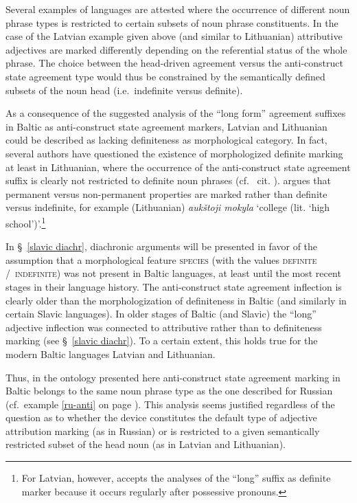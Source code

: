 Several examples of languages are attested where the occurrence of different noun phrase types is restricted to certain subsets of noun phrase constituents. In the case of the Latvian example given above (and similar to Lithuanian) attributive adjectives are marked differently depending on the referential status of the whole phrase. The choice between the head\hyp{}driven agreement versus the anti\hyp{}construct state agreement type would thus be constrained by the semantically defined subsets of the noun head (i.e.~indefinite versus definite). 

As a consequence of the suggested analysis of the “long form” agreement suffixes in Baltic as anti\hyp{}construct state agreement markers, Latvian and Lithuanian could be described as lacking definiteness as morphological category. In fact, several authors have questioned the existence of morphologized definite marking at least in Lithuanian, where the occurrence of the anti\hyp{}construct state agreement suffix is clearly not restricted to definite noun phrases (cf.~\citealt{wissemann1958} cit. \citealt[181–182]{kramsky1972}). \citet[37]{trost1966} argues that permanent versus non-permanent properties are marked rather than definite versus indefinite, for example (Lithuanian) \textit{aukštoji mokyla} ‘college (lit. ‘high school’)’.\footnote{For Latvian, however, \citet[38]{trost1966} accepts the analyses of the “long” suffix as definite marker because it occurs regularly after possessive pronouns.}

In \S~\ref{slavic diachr}, diachronic arguments will be presented in favor of the assumption that a morphological feature \textsc{species} (with the values \textsc{definite} /~\textsc{indefinite}) was not present in Baltic languages, at least until the most recent stages in their language history. The anti\hyp{}construct state agreement inflection is clearly older than the morphologization of definiteness in Baltic (and similarly in certain Slavic languages). In older stages of Baltic (and Slavic) the “long” adjective inflection was connected to attributive rather than to definiteness marking (see \S~\ref{slavic diachr}). To a certain extent, this holds true for the modern Baltic languages Latvian and Lithuanian.

Thus, in the ontology presented here anti\hyp{}construct state agreement marking in Baltic belongs to the same noun phrase type as the one described for Russian (cf.~example \ref{ru-anti} on page \pageref{ru-anti}). This analysis seems justified regardless of the question as to whether the device constitutes the default type of adjective attribution marking (as in Russian) or is restricted to a given semantically restricted subset of the head noun (as in Latvian and Lithuanian).

